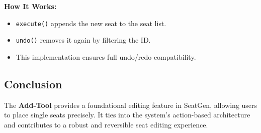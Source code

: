 \textbf{How It Works:}
\begin{itemize}
    \item \texttt{execute()} appends the new seat to the seat list.
    \item \texttt{undo()} removes it again by filtering the ID.
    \item This implementation ensures full undo/redo compatibility.
\end{itemize}

\subsection{Conclusion}
The \textbf{Add-Tool} provides a foundational editing feature in SeatGen, allowing users to place single seats precisely. It ties into the system's action-based architecture and contributes to a robust and reversible seat editing experience.
